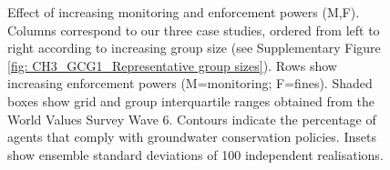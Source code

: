 \documentclass[12pt, a4paper]{article}
\begin{document}
\begin{figure}
	\caption{Effect of increasing monitoring and enforcement powers (M,F). Columns correspond to our three case studies, ordered from left to right according to increasing group size (see Supplementary Figure \ref{fig: CH3_GCG1_Representative group sizes}). Rows show increasing enforcement powers (M=monitoring; F=fines). Shaded boxes show grid and group interquartile ranges obtained from the World Values Survey Wave 6. Contours indicate the percentage of agents that comply with groundwater conservation policies. Insets show ensemble standard deviations of 100 independent realisations. } \label{fig: CH3_GCG1_WVS raw statistics}
	\begin{center}
	\end{center}
\end{figure}
\end{document}
